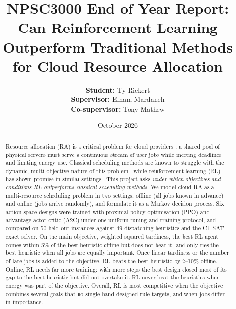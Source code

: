 \documentclass[12pt]{article}
\title{NPSC3000 End of Year Report: Can Reinforcement Learning Outperform Traditional Methods for Cloud Resource Allocation}
\author{
\textbf{Student:} Ty Riekert \\
\textbf{Supervisor:} Elham Mardaneh \\
\textbf{Co-supervisor:} Tony Mathew
}
\date{October 2026}
\begin{document}
\maketitle

\begin{abstract}
Resource allocation (RA) is a critical problem for cloud providers \cite{saidi2023, sdn2021, vinothina2012, parikh2013, mohamaddiah2014}: a shared pool of physical servers must serve a continuous stream of user jobs while meeting deadlines and limiting energy use. Classical scheduling methods are known to struggle with the dynamic, multi-objective nature of this problem \cite{lbts2024, 10854610, DAHMANI2025100616}, while reinforcement learning (RL) has shown promise in similar settings \cite{saidi2023, autoscaling2023, lbts2024, dynamic2026}. This project asks \emph{under which objectives and conditions RL outperforms classical scheduling methods}. We model cloud RA as a multi-resource scheduling problem in two settings, offline (all jobs known in advance) and online (jobs arrive randomly), and formulate it as a Markov decision process. Six action-space designs were trained with proximal policy optimisation (PPO) and advantage actor-critic (A2C) under one uniform tuning and training protocol, and compared on 50 held-out instances against 49 dispatching heuristics and the CP-SAT exact solver. On the main objective, weighted squared tardiness, the best RL agent comes within 5\% of the best heuristic offline but does not beat it, and only ties the best heuristic when all jobs are equally important. Once linear tardiness or the number of late jobs is added to the objective, RL beats the best heuristic by 2--10\% offline. Online, RL needs far more training: with more steps the best design closed most of its gap to the best heuristic but did not overtake it. RL never beat the heuristics when energy was part of the objective. Overall, RL is most competitive when the objective combines several goals that no single hand-designed rule targets, and when jobs differ in importance.
\end{abstract}

\newpage
\end{document}
